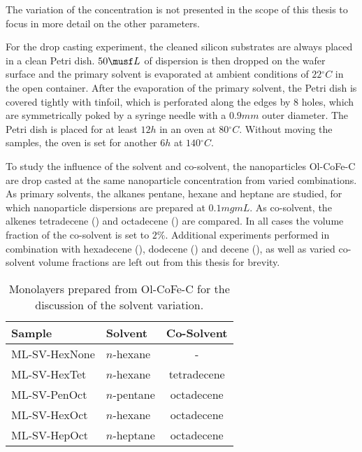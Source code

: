 \documentclass[\main/dresen_thesis.tex]{subfiles}
\begin{document}
    The variation of the concentration is not presented in the scope of this thesis to focus in more detail on the other parameters.

      For the drop casting experiment, the cleaned silicon substrates are always placed in a clean Petri dish.
      $50 \musf L$ of dispersion is then dropped on the wafer surface and the primary solvent is evaporated at ambient conditions of $22 \unit{^\circ C}$ in the open container.
      After the evaporation of the primary solvent, the Petri dish is covered tightly with tinfoil, which is perforated along the edges by 8 holes, which are symmetrically poked by a syringe needle with a $0.9 \unit{mm}$ outer diameter.
      The Petri dish is placed for at least $12 \unit{h}$ in an oven at $80 \unit{^\circ C}$.
      Without moving the samples, the oven is set for another $6 \unit{h}$ at $140\unit{^\circ C}$.

      To study the influence of the solvent and co-solvent, the nanoparticles Ol-CoFe-C are drop casted at the same nanoparticle concentration from varied combinations.
      As primary solvents, the alkanes pentane, hexane and heptane are studied, for which nanoparticle dispersions are prepared at $0.1 \unit{mg mL}$.
      As co-solvent, the alkenes tetradecene () and octadecene () are compared.
      In all cases the volume fraction of the co-solvent is set to $2 \%$.
      Additional experiments performed in combination with hexadecene (), dodecene () and decene (), as well as varied co-solvent volume fractions are left out from this thesis for brevity.


      \begin{table}[!htbp]
        \centering
        \caption{\label{tab:monolayers:charMethod:varyAlkaneAlkene}Monolayers prepared from Ol-CoFe-C for the discussion of the solvent variation.}
        \begin{tabular}{ l | l | c }
          \textbf{Sample} & Solvent              & Co-Solvent \\
          \hline
          ML-SV-HexNone   & $\mathit{n}$-hexane  & -          \\
          ML-SV-HexTet    & $\mathit{n}$-hexane  & tetradecene\\
          ML-SV-PenOct    & $\mathit{n}$-pentane & octadecene \\
          ML-SV-HexOct    & $\mathit{n}$-hexane  & octadecene \\
          ML-SV-HepOct    & $\mathit{n}$-heptane & octadecene \\
          \hline
        \end{tabular}
      \end{table}
\end{document}
